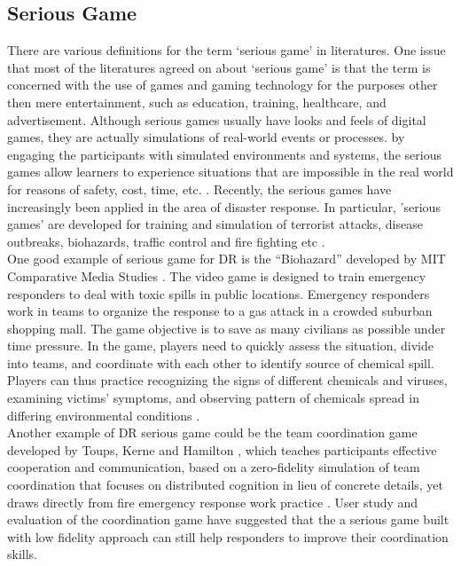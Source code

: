 \subsection{Serious Game}
There are various definitions for the term `serious game' in literatures. One issue that most of the literatures agreed on about `serious game' is that the term is concerned with the use of games and gaming technology for the purposes other then mere entertainment, such as education, training, healthcare, and advertisement.\cite{Susi2007} Although serious games usually have looks and feels of digital games, they are actually simulations of real-world events or processes. by engaging the participants with simulated environments and systems, the serious games allow learners to experience situations that are impossible in the real world for reasons of safety, cost, time, etc. \cite{Squire2003,Meesters2013}. Recently, the serious games have increasingly been applied in the area of disaster response. In particular, 'serious games' are developed for training and simulation of terrorist attacks, disease outbreaks, biohazards, traffic control and fire fighting etc \cite{Susi2007,Squire2003}. \\

One good example of serious game for \ac{DR} is the ``Biohazard'' developed by MIT Comparative Media Studies \cite{Squire2003}. The video game is designed to train emergency responders to deal with toxic spills in public locations. Emergency responders work in teams to organize the response to a gas attack in a crowded suburban shopping mall. The game objective is to save as many civilians as possible under time pressure. In the game,  players need to quickly assess the situation, divide into teams, and coordinate with each other to identify source of chemical spill. Players can thus practice recognizing the signs of different chemicals and viruses, examining victims' symptoms, and observing pattern of chemicals spread in differing environmental conditions \cite{Susi2007}.\\


Another example of \ac{DR} serious game could be the team coordination game developed by Toups, Kerne and Hamilton \cite{Toups2011}, which teaches participants effective cooperation and communication, based on a zero-fidelity simulation of team coordination that focuses on distributed cognition in lieu of concrete details, yet draws directly from fire emergency response work practice \cite{Toups2011}. User study and evaluation of the coordination game have suggested that the a serious game built with low fidelity approach can still help responders to improve their coordination skills.\\

